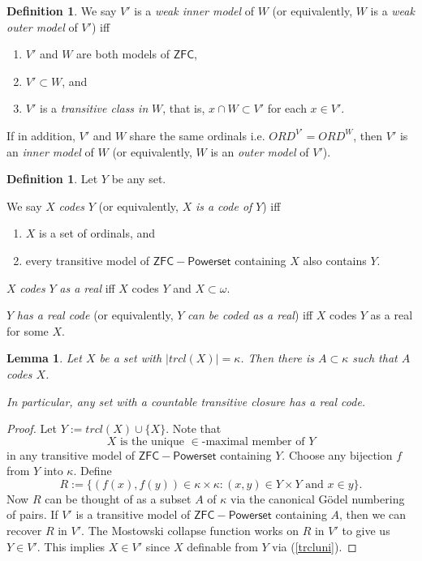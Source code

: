 \documentclass[12pt, twoside]{memoir}
\numberwithin{equation}{section}
\newtheorem{lem}[thm]{Lemma}
\theoremstyle{definition}
\newtheorem{defi}[thm]{Definition}
\theoremstyle{remark}
\theoremstyle{definition}
\theoremstyle{definition}
\theoremstyle{definition}
\theoremstyle{remark}
\begin{document}
\begin{defi}\label{inoutmodels}
We say $V'$ is a \emph{weak inner model} of $W$ (or equivalently, $W$ is a \emph{weak outer model} of $V'$) iff
\begin{enumerate}[label=(\alph*)]
    \item $V'$ and $W$ are both models of $\mathsf{ZFC}$,
    \item $V' \subset W$, and
    \item $V'$ is a \textit{transitive class in} $W$, that is, $x \cap W \subset V'$ for each $x \in V'$.
\end{enumerate}
If in addition, $V'$ and $W$ share the same ordinals i.e. $ORD^{V'} = ORD^W$, then $V'$ is an \emph{inner model} of $W$ (or equivalently, $W$ is an \emph{outer model} of $V'$).
\end{defi}
\begin{defi}
Let $Y$ be any set.

We say $X$ \emph{codes} $Y$ (or equivalently, $X$ \emph{is a code of} $Y$) iff 
\begin{enumerate}[label=(\alph*)]
    \item $X$ is a set of ordinals, and
    \item every transitive model of $\mathsf{ZFC - Powerset}$ containing $X$ also contains $Y$.
\end{enumerate}

$X$ \emph{codes} $Y$ \emph{as a real} iff $X$ codes $Y$ and $X \subset \omega$.

$Y$ \emph{has a real code} (or equivalently, $Y$ \emph{can be coded as a real}) iff $X$ codes $Y$ as a real for some $X$.
\end{defi}

\begin{lem}\label{setcode}
Let $X$ be a set with $|trcl(X)| = \kappa$. Then there is $A \subset \kappa$ such that $A$ codes $X$.

In particular, any set with a countable transitive closure has a real code.
\end{lem}

\begin{proof}
Let $Y := trcl(X) \cup \{X\}$. Note that 
\begin{equation}\label{trcluni}
    X \text{ is the unique } \! \in \!\text{-maximal member of } Y
\end{equation} 
in any transitive model of $\mathsf{ZFC - Powerset}$ containing $Y$. Choose any bijection $f$ from $Y$ into $\kappa$. Define $$R := \{(f(x), f(y)) \in \kappa \times \kappa : (x, y) \in Y \times Y \text{ and } x \in y\}.$$ Now $R$ can be thought of as a subset $A$ of $\kappa$ via the canonical G\"{o}del numbering of pairs. If $V'$ is a transitive model of $\mathsf{ZFC - Powerset}$ containing $A$, then we can recover $R$ in $V'$. The Mostowski collapse function works on $R$ in $V'$ to give us $Y \in V'$. This implies $X \in V'$ since $X$ definable from $Y$ via (\ref{trcluni}).
\end{proof}
\end{document}
